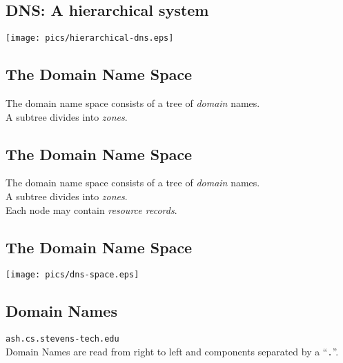 \documentclass[xga]{xdvislides}
\begin{document}
\subsection{DNS: A hierarchical system}
\vspace*{\fill}
\begin{center}
	\texttt{[image: pics/hierarchical-dns.eps]}
\end{center}
\vspace*{\fill}

\subsection{The Domain Name Space}
\vspace{.5in}
\begin{center}
	\Huge
	The domain name space consists of a tree of {\em domain} names. \\
	\vspace{.5in}
	A subtree divides into {\em zones}.
\end{center}
\Normalsize

\subsection{The Domain Name Space}
\vspace{.5in}
\begin{center}
	\Huge
	The domain name space consists of a tree of {\em domain} names. \\
	\vspace{.5in}
	A subtree divides into {\em zones}. \\
	\vspace{.5in}
	Each node may contain {\em resource records}.
\end{center}
\Normalsize

\subsection{The Domain Name Space}
\vspace*{\fill}
\begin{center}
	\texttt{[image: pics/dns-space.eps]}
\end{center}
\vspace*{\fill}

\subsection{Domain Names}
\vspace{.5in}
\begin{center}
	\Huge
	\verb+ash.cs.stevens-tech.edu+ \\
	\vspace{.5in}
	Domain Names are read from right to left and components separated by a ``\verb+.+''.
\end{center}
\Normalsize
\end{document}

